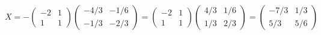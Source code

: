\documentclass[a4paper,12pt]{article}
\begin{document}
\begin{ejercicio}[title=Ejercicio 21]
\[
X = - 
\begin{pmatrix}-2 & 1\\ 1 & 1\end{pmatrix}
\begin{pmatrix}-4/3 & -1/6\\ -1/3 & -2/3\end{pmatrix}
=
\begin{pmatrix}-2 & 1\\ 1 & 1\end{pmatrix}
\begin{pmatrix}4/3 & 1/6\\ 1/3 & 2/3\end{pmatrix}
=
\boxed{
\begin{pmatrix}
-7/3 & 1/3\\
5/3 & 5/6
\end{pmatrix}
}
\]

\end{ejercicio}
\end{document}
